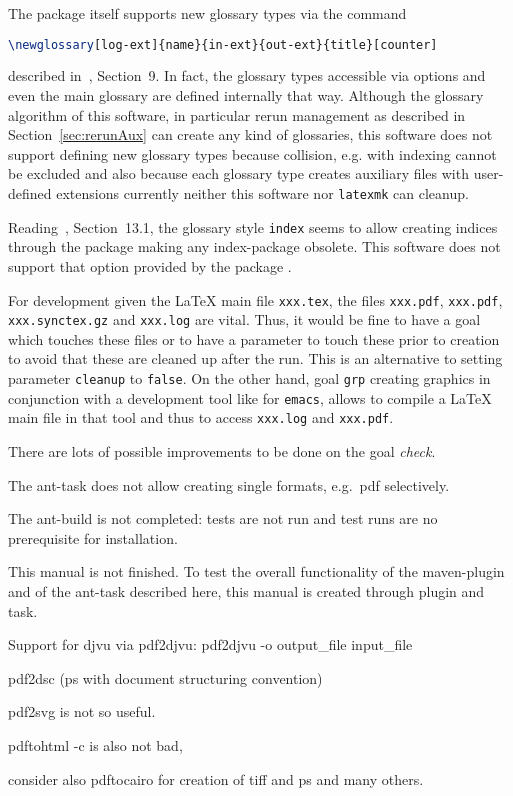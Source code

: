 The package  itself 
supports new glossary types via the command
%
\begin{lstlisting}[language=TeX, basicstyle=\small]
\newglossary[log-ext]{name}{in-ext}{out-ext}{title}[counter]
\end{lstlisting}
%
described in~\cite{GloP4_54}, Section~9. 
In fact, the glossary types accessible via options and even the main glossary 
are defined internally that way. 
Although the glossary algorithm of this software, 
in particular rerun management as described in Section~\ref{sec:rerunAux}
can create any kind of glossaries, 
this software does not support defining new glossary types 
because collision, e.g. with indexing cannot be excluded 
and also because each glossary type creates auxiliary files 
with user-defined extensions currently neither this software 
nor \texttt{latexmk} can cleanup. 

Reading~\cite{GloP4_54}, Section~13.1, the glossary style \texttt{index} 
seems to allow creating indices through the  package 
making any index-package obsolete. 
This software does not support that option provided by the package . 

For development given the \LaTeX{} main file \texttt{xxx.tex}, 
the files \texttt{xxx.pdf}, \texttt{xxx.pdf}, \texttt{xxx.synctex.gz} 
and \texttt{xxx.log} are vital. 
Thus, it would be fine to have a goal which touches these files 
or to have a parameter to touch these prior to creation 
to avoid that these are cleaned up after the run. 
This is an alternative to setting parameter \texttt{cleanup} to \texttt{false}. 
On the other hand, goal \texttt{grp} creating graphics 
in conjunction with a development tool like \auctex{} for \texttt{emacs}, 
allows to compile a \LaTeX{} main file in that tool 
and thus to access \texttt{xxx.log} and \texttt{xxx.pdf}. 

There are lots of possible improvements to be done on the goal \emph{check}. 


The ant-task does not allow creating single formats, e.g.~pdf selectively. 

The ant-build is not completed: tests are not run and 
test runs are no prerequisite for installation. 

This manual is not finished. 
To test the overall functionality of the maven-plugin and of the ant-task 
described here, this manual is created through plugin and task. 

Support for djvu via pdf2djvu: 
pdf2djvu -o output\_file input\_file

pdf2dsc
(ps with document structuring convention) 

pdf2svg is not so useful. 

pdftohtml -c is also not bad, 

consider also pdftocairo for creation of tiff and ps and many others. 
